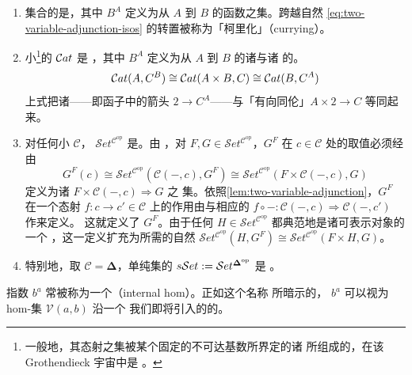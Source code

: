 \begin{example}[\trCartesianClosed{}\trCategory]\label{exa:cartesian-closed-examples}
\begin{enumerate}[label=(\roman*)]
\item 集合的\trCategory{}是\trCartesianClosed，其中 $B^{A}$ 定义为从 $A$
  到 $B$ 的函数之集。跨越自然\trIsomorphism{}
  \eqref{eq:two-variable-adjunction-isos} 的转置被称为「柯里化」（currying）。
\item 小\footnote{一般地，其态射之集被某个固定的不可达基数所界定的诸%
\trCategory{}所组成的\trCategory，在该 Grothendieck 宇宙中是%
\trCartesianClosed{}。}\trCategory{}的\trCategory{} $\mathcal{C}at$ 是%
\trCartesianClosed{}，其中 $B^{A}$ 定义为从 $A$ 到 $B$ 的诸\trFunctor{}与诸%
\trNaturalTransformation{}的\trCategory。
\[ \mathcal{C}at(A,C^{B})\cong\mathcal{C}at(A\times B,C)\cong\mathcal{C}at(B,C^{A}) \]
上式把诸\trNaturalTransformation{}——即函子\trCategory{}中的箭头
$2\to C^{A}$——与「有向同伦」$A\times 2\to C$ 等同起来。
\item 对任何小\trCategory{} $\mathcal{C}$，\trCategory{}
  $\mathcal{S}et^{\mathcal{C}^{\mathrm{op}}}$ 是\trCartesianClosed。由%
\trYonedaLemma，对 $F,G\in\mathcal{S}et^{\mathcal{C}^{\mathrm{op}}}$，$G^{F}$
在 $c\in\mathcal{C}$ 处的取值必须经由
\[ G^{F}(c)\cong\mathcal{S}et^{\mathcal{C}^{\mathrm{op}}}(\mathcal{C}(-,c),G^{F})
   \cong\mathcal{S}et^{\mathcal{C}^{\mathrm{op}}}(F\times\mathcal{C}(-,c),G) \]
定义为诸\trNaturalTransformation{} $F\times\mathcal{C}(-,c)\Rightarrow G$ 之
集。依照\cref{lem:two-variable-adjunction}，$G^{F}$ 在一个态射
$f\colon c\to c'\in\mathcal{C}$ 上的作用由与相应的\trNaturalTransformation{}
$f\circ-\colon\mathcal{C}(-,c)\Rightarrow\mathcal{C}(-,c')$ 作\trPreComposition{}来定义。
这就定义了\trFunctor{} $G^{F}$。由于任何\trFunctor{}
$H\in\mathcal{S}et^{\mathcal{C}^{\mathrm{op}}}$ 都典范地是诸可表示对象的一个%
\trColimit，这一定义扩充为所需的自然\trIsomorphism{}
$\mathcal{S}et^{\mathcal{C}^{\mathrm{op}}}(H,G^{F})\cong\mathcal{S}et^{\mathcal{C}^{\mathrm{op}}}(F\times H,G)$。
\item 特别地，取 $\mathcal{C}=\boldsymbol{\Delta}$，单纯集的\trCategory{}
  $s\mathcal{S}et:=\mathcal{S}et^{\boldsymbol{\Delta}^{\mathrm{op}}}$ 是%
\trCartesianClosed{}。
\end{enumerate}
\end{example}

指数 $b^{a}$ 常被称为一个\emph{\trInternalHom}（internal hom）。正如这个名称
所暗示的，\trInternalHom{} $b^{a}$ 可以视为 hom-集 $\mathcal{V}(a,b)$ 沿一个
我们即将引入的\trFunctor{}的\trLifting。

